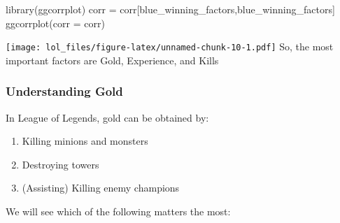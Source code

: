 \documentclass[
]{article}
\newenvironment{Shaded}{\begin{snugshade}}{\end{snugshade}}
\newcommand{\AttributeTok}[1]{\textcolor[rgb]{0.77,0.63,0.00}{#1}}
\newcommand{\DecValTok}[1]{\textcolor[rgb]{0.00,0.00,0.81}{#1}}
\newcommand{\FunctionTok}[1]{\textcolor[rgb]{0.00,0.00,0.00}{#1}}
\newcommand{\NormalTok}[1]{#1}
\newcommand{\OtherTok}[1]{\textcolor[rgb]{0.56,0.35,0.01}{#1}}
\newcommand{\SpecialCharTok}[1]{\textcolor[rgb]{0.00,0.00,0.00}{#1}}
\newcommand{\StringTok}[1]{\textcolor[rgb]{0.31,0.60,0.02}{#1}}
\begin{document}
\begin{Shaded}
\end{Shaded}

\begin{Shaded}
\begin{Highlighting}[]
\FunctionTok{library}\NormalTok{(ggcorrplot)}
\NormalTok{corr }\OtherTok{=}\NormalTok{ corr[blue\_winning\_factors,blue\_winning\_factors]}
\FunctionTok{ggcorrplot}\NormalTok{(}\AttributeTok{corr =}\NormalTok{ corr)}
\end{Highlighting}
\end{Shaded}

\texttt{[image: lol\_files/figure-latex/unnamed-chunk-10-1.pdf]} So, the
most important factors are Gold, Experience, and Kills

\hypertarget{understanding-gold}{%
\subsubsection{Understanding Gold}\label{understanding-gold}}

In League of Legends, gold can be obtained by:

\begin{enumerate}
\def\labelenumi{\arabic{enumi}.}
\item
  Killing minions and monsters
\item
  Destroying towers
\item
  (Assisting) Killing enemy champions
\end{enumerate}

We will see which of the following matters the most:
\end{document}
